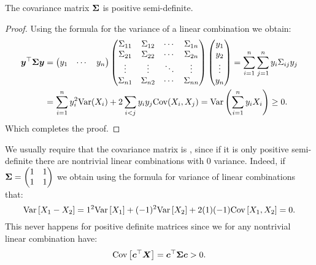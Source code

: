 \begin{proposition}
    The covariance matrix $\boldsymbol{\Sigma}$ is positive semi-definite.
\end{proposition}
\begin{proof}
    Using the formula for the variance of a linear combination we obtain:
    \begin{align*}
        \boldsymbol{y}^\top \boldsymbol{\Sigma} \boldsymbol{y} 
        &= 
        \begin{pmatrix}
        y_1 & \cdots & y_n
        \end{pmatrix}
        \begin{pmatrix}
        \Sigma_{11} & \Sigma_{12} & \cdots & \Sigma_{1n} \\
        \Sigma_{21} & \Sigma_{22} & \cdots & \Sigma_{2n} \\
        \vdots & \vdots & \ddots & \vdots \\
        \Sigma_{n1} & \Sigma_{n2} & \cdots & \Sigma_{nn}
        \end{pmatrix}
        \begin{pmatrix}
        y_1 \\
        y_2 \\
        \vdots \\
        y_n
        \end{pmatrix}
        = \sum_{i=1}^{n} \sum_{j=1}^{n} y_i \Sigma_{ij} y_j
        \\&= \sum_{i=1}^{n} y_i^2 \text{Var}(X_i) + 2 \sum_{i < j} y_i y_j \text{Cov}(X_i, X_j)
        = \text{Var}\left( \sum_{i=1}^{n} y_i X_i \right)
        \geq 0. 
    \end{align*}
    Which completes the proof.
\end{proof}

\begin{remark}
    We usually require that the covariance matrix is , since if it is only positive semi-definite there are nontrivial linear combinations with 0 variance. Indeed, if 
    $\boldsymbol{\Sigma}=\begin{pmatrix}
        1 & 1 \\ 1 & 1
    \end{pmatrix}$
    we obtain using the formula for variance of linear combinations that:
    $$
        \mathrm{Var}\left[X_1 - X_2\right] = 1^2 \mathrm{Var}\left[X_1\right] + (-1)^2 \mathrm{Var}\left[X_2\right] + 2(1)(-1) \mathrm{Cov}\left[X_1, X_2\right] = 0.
    $$
    This never happens for positive definite matrices since we for any nontrivial linear combination have:
    $$
        \mathrm{Cov}\left[\boldsymbol{c}^\top \boldsymbol{X}\right] = \boldsymbol{c}^\top \boldsymbol{\Sigma} \boldsymbol{c} > 0.
    $$        
\end{remark}

